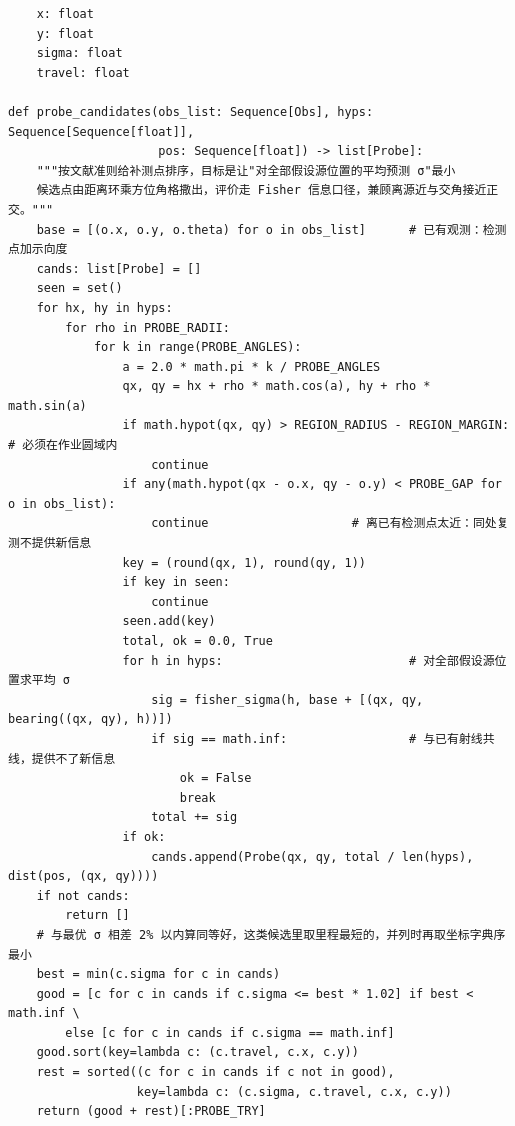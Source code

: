 \documentclass[UTF8, zihao=5,AutoFakeBold=2]{ctexart}
\begin{document}
\begin{lstlisting}
    x: float
    y: float
    sigma: float
    travel: float

def probe_candidates(obs_list: Sequence[Obs], hyps: Sequence[Sequence[float]],
                     pos: Sequence[float]) -> list[Probe]:
    """按文献准则给补测点排序，目标是让"对全部假设源位置的平均预测 σ"最小
    候选点由距离环乘方位角格撒出，评价走 Fisher 信息口径，兼顾离源近与交角接近正交。"""
    base = [(o.x, o.y, o.theta) for o in obs_list]      # 已有观测：检测点加示向度
    cands: list[Probe] = []
    seen = set()
    for hx, hy in hyps:
        for rho in PROBE_RADII:
            for k in range(PROBE_ANGLES):
                a = 2.0 * math.pi * k / PROBE_ANGLES
                qx, qy = hx + rho * math.cos(a), hy + rho * math.sin(a)
                if math.hypot(qx, qy) > REGION_RADIUS - REGION_MARGIN:   # 必须在作业圆域内
                    continue
                if any(math.hypot(qx - o.x, qy - o.y) < PROBE_GAP for o in obs_list):
                    continue                    # 离已有检测点太近：同处复测不提供新信息
                key = (round(qx, 1), round(qy, 1))
                if key in seen:
                    continue
                seen.add(key)
                total, ok = 0.0, True
                for h in hyps:                          # 对全部假设源位置求平均 σ
                    sig = fisher_sigma(h, base + [(qx, qy, bearing((qx, qy), h))])
                    if sig == math.inf:                 # 与已有射线共线，提供不了新信息
                        ok = False
                        break
                    total += sig
                if ok:
                    cands.append(Probe(qx, qy, total / len(hyps), dist(pos, (qx, qy))))
    if not cands:
        return []
    # 与最优 σ 相差 2% 以内算同等好，这类候选里取里程最短的，并列时再取坐标字典序最小
    best = min(c.sigma for c in cands)
    good = [c for c in cands if c.sigma <= best * 1.02] if best < math.inf \
        else [c for c in cands if c.sigma == math.inf]
    good.sort(key=lambda c: (c.travel, c.x, c.y))
    rest = sorted((c for c in cands if c not in good),
                  key=lambda c: (c.sigma, c.travel, c.x, c.y))
    return (good + rest)[:PROBE_TRY]
	\end{lstlisting}
\end{document}
